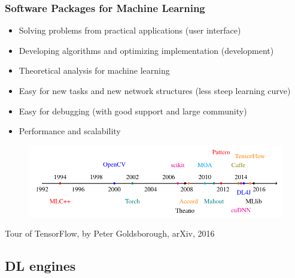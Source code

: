 \begin{frame}
  \MyLogo
  \frametitle{Software Packages for Machine Learning}  
\small

\begin{itemize}
\item Solving problems from practical applications (user interface)
\item Developing algorithms and optimizing implementation (development)
\item Theoretical analysis for machine learning
\end{itemize}

\begin{itemize}
\item Easy for new tasks and new network structures (less steep learning curve)
\item Easy for debugging (with good support and large community)
\item Performance and scalability
\end{itemize}

\vskip -12pt
\begin{figure}[htbp] %
   \centering
   \includegraphics[width=0.9\linewidth]{figures/ML.pdf} 
\end{figure}

\begin{center}
{\color{red} \scriptsize
Tour of TensorFlow, by Peter Goldsborough, arXiv, 2016}
\end{center}


\end{frame}

\subsection{DL engines}

